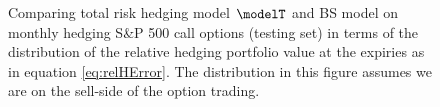 \begin{figure}[htp!]
		\centering
	\caption{Comparing total risk hedging model $\modelT$ and BS model  on monthly hedging S\&P 500 call options (testing set) in terms of the distribution of the  relative hedging portfolio value at the expiries as in equation \eqref{eq:relHError}. The distribution in this figure assumes we are on the sell-side of the option trading.} 
	\label{fig:CallTotalM2}
		\centering

\end{figure}
